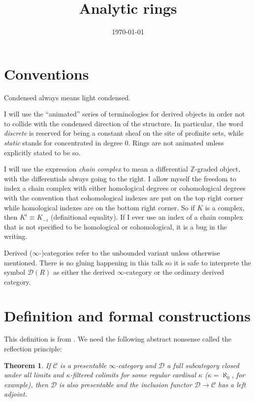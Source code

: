 \documentclass{article}
\title{Analytic rings}
\author{}
\date{\today}
\theoremstyle{plain}
\newtheorem{thm}{Theorem}
\theoremstyle{definition}
\theoremstyle{remark}
\newcommand{\quot}[1]{“#1”}
\newcommand{\D}{\mathcal{D}}
\begin{document}
\maketitle

\section*{Conventions}

Condensed always means light condensed.

I will use the \quot{animated} series of terminologies for derived objects in order not to collide with the condensed direction of the structure.
In particular,
the word \emph{discrete} is reserved for being a constant sheaf on the site of profinite sets, while
\emph{static} stands for concentrated in degree $ 0 $.
Rings are not animated unless explicitly stated to be so.

I will use the expression \emph{chain complex} to mean a differential $ \mathbb{Z} $-graded object, with
the differentials always going to the right.
I allow myself the freedom to index a chain complex with either homological degrees or cohomological degrees with the convention that
cohomological indexes are put on the top right corner while homological indexes are on the bottom right corner.
So if $ K $ is a complex, then $ K ^{i} \equiv K _{-i} $ (definitional equality).
If I ever use an index of a chain complex that is not specified to be homological or cohomological, it is a bug in the writing.

Derived ($ \infty $-)categories refer to the unbounded variant unless otherwise mentioned.
There is no gluing happening in this talk so it is safe to interprete the symbol $ \D(R) $ as either the derived $ \infty $-category
or the ordinary derived category.

\section{Definition and formal constructions}
This definition is from \cite[\href
{https://www.youtube.com/watch?v=YxSZ1mTIpaA\&list=PLx5f8IelFRgGmu6gmL-Kf\_Rl\_6Mm7juZO\&t=3962s}{Video 1, 1:06:02}]{ihesvid}.
We need the following abstract nonsense called the reflection principle:
\begin{thm}
If $ \mathcal{C} $ is a presentable $ \infty $-category and $ \mathcal{D} $ a full subcategory closed under all limits and $ \kappa $-filtered colimits
for some regular cardinal $ \kappa $ ($ \kappa = \aleph _{0} $, for example),
then $ \mathcal{D} $ is also presentable and the inclusion functor $ \mathcal{D}\to \mathcal{C} $ has a left adjoint.
\end{thm}
\end{document}

